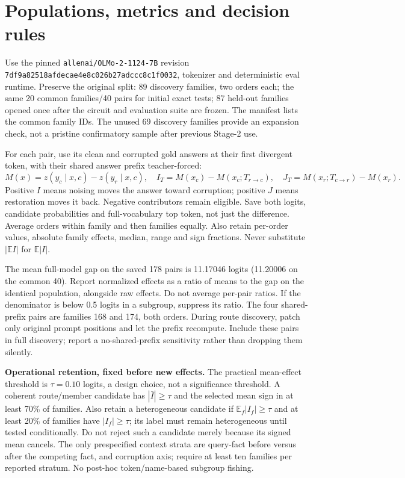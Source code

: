 \documentclass[11pt,a4paper]{article}
\newcommand{\file}[1]{\nolinkurl{#1}}
\newcommand{\E}{\mathbb{E}}
\begin{document}
\section{Populations, metrics and decision rules}
\label{sec:metrics}
Use the pinned \file{allenai/OLMo-2-1124-7B} revision
\file{7df9a82518afdecae4e8c026b27adccc8c1f0032}, tokenizer and deterministic eval
runtime. Preserve the original split: 89 discovery families, two orders each;
the same 20 common families/40 pairs for initial exact tests; 87 held-out families
opened once after the circuit and evaluation suite are frozen. The manifest lists
the common family IDs. The unused 69 discovery families provide an expansion check,
not a pristine confirmatory sample after previous Stage-2 use.

For each pair, use its clean and corrupted gold answers at their first divergent
token, with their shared answer prefix teacher-forced:
\[
 M(x)=z(y_c\mid x,c)-z(y_r\mid x,c),\quad
 I_T=M(x_c)-M(x_c;T_{r\to c}),\quad
 J_T=M(x_r;T_{c\to r})-M(x_r).
\]
Positive $I$ means noising moves the answer toward corruption; positive $J$ means
restoration moves it back. Negative contributors remain eligible. Save both logits,
candidate probabilities and full-vocabulary top token, not just the difference.
Average orders within family and then families equally. Also retain per-order values,
absolute family effects, median, range and sign fractions. Never substitute
$|\E I|$ for $\E|I|$.

The mean full-model gap on the saved 178 pairs is 11.17046 logits (11.20006 on the
common 40). Report normalized effects as a ratio of means to the gap on the identical
population, alongside raw effects. Do not average per-pair ratios. If the denominator
is below 0.5 logits in a subgroup, suppress its ratio. The four shared-prefix pairs
are families 168 and 174, both orders. During route discovery, patch only original
prompt positions and let the prefix recompute. Include these pairs in full discovery;
report a no-shared-prefix sensitivity rather than dropping them silently.

\textbf{Operational retention, fixed before new effects.} The practical mean-effect
threshold is $\tau=0.10$ logits, a design choice, not a significance threshold.
A coherent route/member candidate has $|\bar I|\ge\tau$ and the selected mean sign in
at least 70\% of families. Also retain a heterogeneous candidate if
$\E_f|I_f|\ge\tau$ and at least 20\% of families have $|I_f|\ge\tau$; its label must
remain heterogeneous until tested conditionally. Do not reject such a candidate merely
because its signed mean cancels. The only prespecified context strata are query-fact
before versus after the competing fact, and corruption axis; require at least ten
families per reported stratum. No post-hoc token/name-based subgroup fishing.
\end{document}
